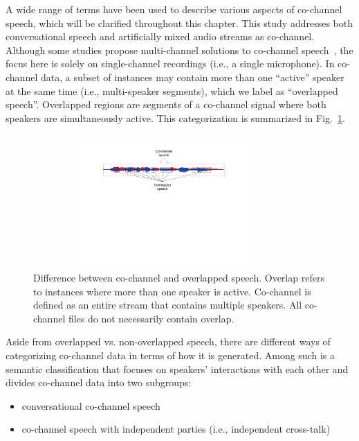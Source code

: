 A wide range of terms have been used to describe various aspects of co-channel speech, 
which will be clarified throughout this chapter. 
This study addresses both conversational speech and artificially mixed audio streams as co-channel. 
Although some studies propose multi-channel solutions to co-channel speech~\cite{panahi2009blind,xiao2011overlapped}, the focus here is solely on single-channel recordings (i.e., a single microphone). 
In co-channel data, a subset of instances may contain more than one ``active'' speaker at the same time (i.e., multi-speaker segments), 
which we label as ``overlapped speech''. 
Overlapped regions are segments of a co-channel signal where both speakers are simultaneously active. This categorization is summarized in Fig.~\ref{fig:ch1_cochannel_vs_overlap}.


\begin{figure}[h!]
	\centering
	\vspace{0mm}
	\includegraphics[height = 2in, width=0.9\textwidth]{figures/cochannel_vs_overlap-crop}
	\vspace{-3mm}
	\caption{ \small Difference between co-channel and overlapped speech. Overlap refers to instances where more than one speaker is active. Co-channel is defined as an entire stream that contains multiple speakers. All co-channel files do not necessarily contain overlap. }
	\label{fig:ch1_cochannel_vs_overlap}
	\vspace{-3mm}
\end{figure}



Aside from overlapped vs. non-overlapped speech, there are different ways of categorizing co-channel data in terms of how it is generated. 
Among such is a semantic classification that focuses on speakers' interactions with each other and divides co-channel data into two subgroups: 
\begin{itemize}
	\item conversational co-channel speech
	\item co-channel speech with independent parties (i.e., independent cross-talk)
\end{itemize} 

